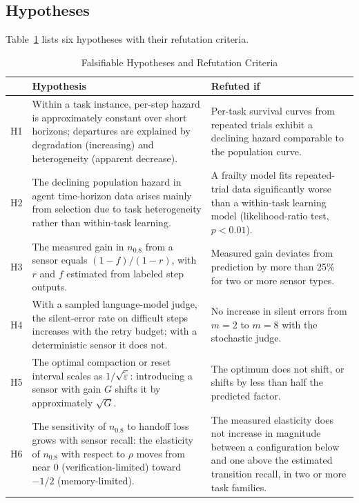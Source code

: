 \documentclass[journal]{IEEEtran}
\newcommand{\et}{\tilde{\varepsilon}}
\begin{document}
\subsection{Hypotheses}
Table~\ref{tab:hyp} lists six hypotheses with their refutation criteria.

\begin{table}[!t]
\centering
\caption{Falsifiable Hypotheses and Refutation Criteria}
\label{tab:hyp}
\small
\begin{tabularx}{\textwidth}{@{}p{0.6cm}XX@{}}
\toprule
 & Hypothesis & Refuted if\\
\midrule
H1 & Within a task instance, per-step hazard is approximately constant over short horizons; departures are explained by degradation (increasing) and heterogeneity (apparent decrease). & Per-task survival curves from repeated trials exhibit a declining hazard comparable to the population curve.\\
H2 & The declining population hazard in agent time-horizon data arises mainly from selection due to task heterogeneity rather than within-task learning. & A frailty model fits repeated-trial data significantly worse than a within-task learning model (likelihood-ratio test, $p<0.01$).\\
H3 & The measured gain in $n_{0.8}$ from a sensor equals $(1-f)/(1-r)$, with $r$ and $f$ estimated from labeled step outputs. & Measured gain deviates from prediction by more than 25\% for two or more sensor types.\\
H4 & With a sampled language-model judge, the silent-error rate on difficult steps increases with the retry budget; with a deterministic sensor it does not. & No increase in silent errors from $m=2$ to $m=8$ with the stochastic judge.\\
H5 & The optimal compaction or reset interval scales as $1/\sqrt{\et}$: introducing a sensor with gain $G$ shifts it by approximately $\sqrt{G}$. & The optimum does not shift, or shifts by less than half the predicted factor.\\
H6 & The sensitivity of $n_{0.8}$ to handoff loss grows with sensor recall: the elasticity of $n_{0.8}$ with respect to $\rho$ moves from near 0 (verification-limited) toward $-1/2$ (memory-limited). & The measured elasticity does not increase in magnitude between a configuration below and one above the estimated transition recall, in two or more task families.\\
\bottomrule
\end{tabularx}
\end{table}
\end{document}
